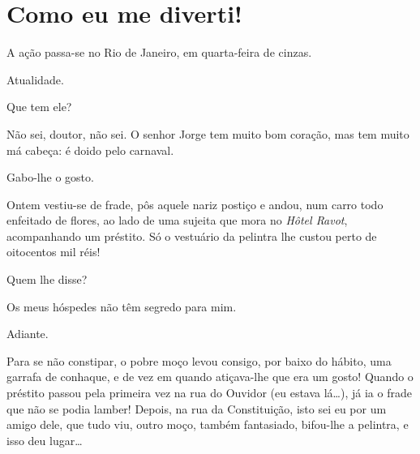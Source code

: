 \chapter[Como eu me diverti!]{Como eu me diverti!}

\castpage





\vfill
A ação passa{}-se no Rio de Janeiro, em quarta{}-feira de cinzas. 

Atualidade.

\pagebreak 
{}




 Que tem ele?

 Não sei, doutor, não sei. O senhor Jorge tem muito bom
coração, mas tem muito má cabeça: é doido pelo carnaval.

 Gabo{}-lhe o gosto.

 Ontem vestiu{}-se de frade, pôs aquele nariz postiço e
andou, num carro todo enfeitado de flores, ao lado de uma sujeita que
mora no \textit{Hôtel Ravot}, acompanhando um préstito. Só o vestuário
da pelintra lhe custou perto de oitocentos mil réis!

 Quem lhe disse?

 Os meus hóspedes não têm segredo para mim.

 Adiante.

 Para se não constipar, o pobre moço levou consigo, por
baixo do hábito, uma garrafa de conhaque, e de vez em quando
atiçava{}-lhe que era um gosto! Quando o préstito passou pela primeira
vez na rua do Ouvidor (eu estava lá\ldots), já ia o frade que não se podia
lamber! Depois, na rua da Constituição, isto sei eu por um amigo dele,
que tudo viu, outro moço, também fantasiado, bifou{}-lhe a pelintra, e
isso deu lugar\ldots

